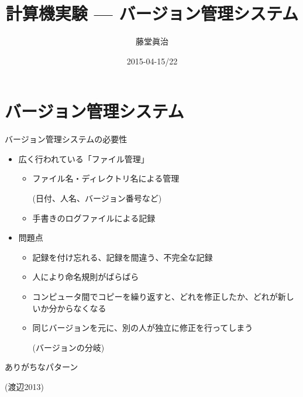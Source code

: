 \documentclass[dvipdfmx]{beamer}
\title{計算機実験 --- バージョン管理システム}
\author{藤堂眞治}
\date{2015-04-15/22}
\begin{document}

\begin{frame}
  \titlepage
  \tableofcontents
\end{frame}

\section{バージョン管理システム}

\begin{frame}[t,fragile]{バージョン管理システムの必要性}
  \begin{itemize}
    \setlength{\itemsep}{1em}
  \item 広く行われている「ファイル管理」
    \begin{itemize}
    \item ファイル名・ディレクトリ名による管理

      (日付、人名、バージョン番号など)
    \item 手書きのログファイルによる記録
    \end{itemize}
  \item 問題点
    \begin{itemize}
    \item 記録を付け忘れる、記録を間違う、不完全な記録
    \item 人により命名規則がばらばら
    \item コンピュータ間でコピーを繰り返すと、どれを修正したか、どれが新しいか分からなくなる
    \item 同じバージョンを元に、別の人が独立に修正を行ってしまう

      (バージョンの分岐)
    \end{itemize}
  \end{itemize}
\end{frame}

\begin{frame}[t,fragile]{ありがちなパターン}
  \vspace*{-1.8em}
  \begin{center}
  \end{center}
  \vspace*{-2em}
  {\footnotesize (渡辺2013)}
\end{frame}
\end{document}
